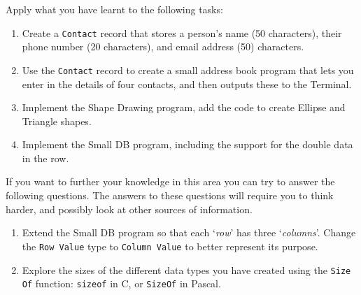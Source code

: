 \clearpage
Apply what you have learnt to the following tasks:

\begin{enumerate}
  \item Create a \texttt{Contact} record that stores a person's name (50 characters), their phone number (20 characters), and email address (50) characters. 
  \item Use the \texttt{Contact} record to create a small address book program that lets you enter in the details of four contacts, and then outputs these to the Terminal.
  \item Implement the Shape Drawing program, add the code to create Ellipse and Triangle shapes.
  \item Implement the Small DB program, including the support for the double data in the row.
\end{enumerate}

\bigskip

If you want to further your knowledge in this area you can try to answer the following questions. The answers to these questions will require you to think harder, and possibly look at other sources of information.

\begin{enumerate}
  \item Extend the Small DB program so that each `\emph{row}' has three `\emph{columns}'. Change the \texttt{Row Value} type to \texttt{Column Value} to better represent its purpose.
  \item Explore the sizes of the different data types you have created using the \texttt{Size Of} function: \texttt{sizeof} in C, or \texttt{SizeOf} in Pascal.
\end{enumerate}